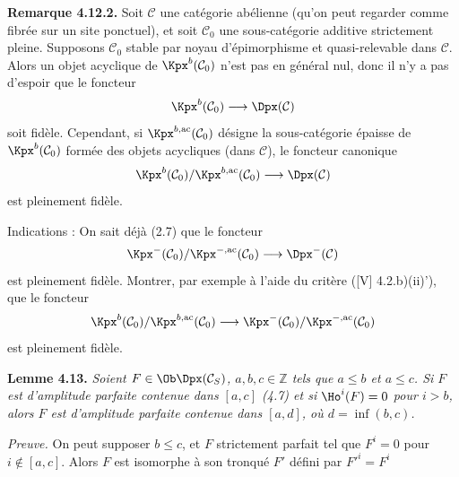 \textbf{Remarque 4.12.2.} Soit \(\mathcal C\) une catégorie abélienne (qu'on peut regarder comme fibrée sur un site ponctuel), et soit \(\mathcal C_0\) une sous-catégorie additive strictement pleine. Supposons \(\mathcal C_0\) stable par noyau d'épimorphisme et quasi-relevable dans \(\mathcal C\). Alors un objet acyclique de \(\Kpx^b(\mathcal C_0)\) n'est pas en général nul, donc il n'y a pas d'espoir que le foncteur
\[
  \Kpx^b(\mathcal C_0)\longrightarrow \Dpx(\mathcal C)
\]
soit fidèle. Cependant, si \(\Kpx^{b,\mathrm{ac}}(\mathcal C_0)\) désigne la sous-catégorie épaisse de \(\Kpx^b(\mathcal C_0)\) formée des objets acycliques (dans \(\mathcal C\)), le foncteur canonique
\[
  \Kpx^b(\mathcal C_0)/\Kpx^{b,\mathrm{ac}}(\mathcal C_0)
  \longrightarrow \Dpx(\mathcal C)
\]
est pleinement fidèle.

Indications : On sait déjà (2.7) que le foncteur
\[
  \Kpx^-(\mathcal C_0)/\Kpx^{-,\mathrm{ac}}(\mathcal C_0)
  \longrightarrow \Dpx^-(\mathcal C)
\]
est pleinement fidèle. Montrer, par exemple à l'aide du critère ([V] 4.2.b)(ii)'), que le foncteur
\[
  \Kpx^b(\mathcal C_0)/\Kpx^{b,\mathrm{ac}}(\mathcal C_0)
  \longrightarrow
  \Kpx^-(\mathcal C_0)/\Kpx^{-,\mathrm{ac}}(\mathcal C_0)
\]
est pleinement fidèle.

\textbf{Lemme 4.13.} \emph{Soient \(F\in\Ob\Dpx(\mathcal C_S)\), \(a,b,c\in\mathbb Z\) tels que \(a\leq b\) et \(a\leq c\). Si \(F\) est d'amplitude parfaite contenue dans \([a,c]\) (4.7) et si \(\Ho^i(F)=0\) pour \(i>b\), alors \(F\) est d'amplitude parfaite contenue dans \([a,d]\), où \(d=\inf(b,c)\).}

\emph{Preuve.} On peut supposer \(b\leq c\), et \(F\) strictement parfait tel que \(F^i=0\) pour \(i\notin[a,c]\). Alors \(F\) est isomorphe à son tronqué \(F'\) défini par \(F'^i=F^i\)
